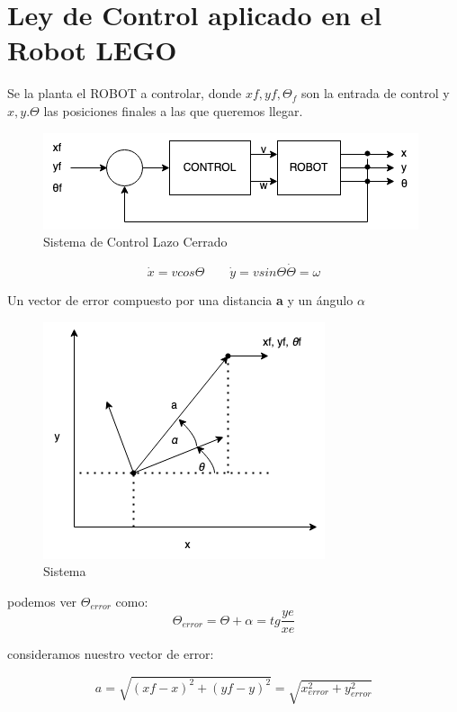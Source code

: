 \documentclass[oneside,onecolumn]{article}
\begin{document}

\section{Ley de Control aplicado en el Robot LEGO}

Se la planta el ROBOT a controlar, donde $xf, yf, \Theta_{f}$ son la entrada de control y $x, y. \Theta$ las posiciones finales a las que queremos llegar.

\begin{figure}[h]
  \centering
  \includegraphics[scale=0.7]{graficos/bloque.png}
  \caption{Sistema de Control Lazo Cerrado}
\end{figure}


\[\dot{x} = v cos \Theta \qquad \dot{y} = v sin \Theta \dot{\Theta} = \omega \]

Un vector de error compuesto por una distancia \textbf{a} y un ángulo \textbf{$\alpha$} 

\begin{figure}[h]
  \centering
  \includegraphics[scale=0.7]{graficos/grafico.png}
  \caption{Sistema}
\end{figure}

podemos ver $\Theta_{error}$ como: \\
\[ \Theta_{error} = \Theta + \alpha = tg \frac{ye}{xe} \]

consideramos nuestro vector de error:

\[ a = \sqrt{(xf-x)^{2}+(yf-y)^2} = \sqrt{x_{error}^{2} + y_{error}^2} \]
\end{document}
